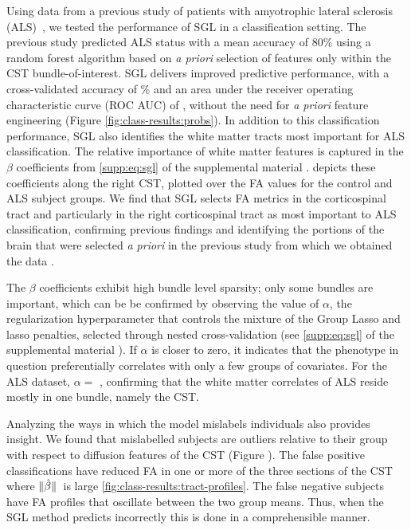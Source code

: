 \documentclass[10pt,%
               aps,%
               prl,%
               preprint,%
               superscriptaddress,%
               preprintnumbers,%
               amsmath,%
               floatfix,%
               endfloats*]{revtex4-1}
\begin{document}
Using data from a previous study of patients with amyotrophic lateral sclerosis (ALS)~\cite{sarica2017corticospinal}, we tested the performance of SGL in a
classification setting. The previous study predicted ALS status with a mean
accuracy of 80\% using a random forest algorithm based on \emph{a priori}
selection of features only within the CST bundle-of-interest.
SGL delivers improved predictive performance, with a cross-validated accuracy of {\alsAccuracy}\% and an area under the receiver operating characteristic curve (ROC AUC) of {\alsRocAuc}, without the need for \emph{a priori} feature engineering (Figure \cref{fig:class-results:probs}). In addition to this
classification performance, SGL also identifies the white matter tracts most
important for ALS classification. The relative importance of white matter
features is captured in the $\beta$ coefficients from \cref{supp:eq:sgl} of
the supplemental material \cite{supplement}.
 depicts these coefficients along the
right CST, plotted over the FA values for the control and ALS subject groups.
We find that SGL selects FA metrics in the corticospinal tract and
particularly in the right corticospinal tract as most important to ALS
classification, confirming previous findings \cite{van2011upper,
toosy2003diffusion, sarica2014tractography, sage2007quantitative,
sage2009quantitative, karlsborg2004corticospinal, ellis1999diffusion,
cosottini2005diffusion, ciccarelli2009investigation, abe2010voxel} and
identifying the portions of the brain that were selected \emph{a priori} in
the previous study from which we obtained the data
\cite{sarica2017corticospinal}.

The $\beta$ coefficients exhibit high bundle level sparsity; only some
bundles are important, which can be be confirmed by observing the value of
$\alpha$, the regularization hyperparameter that controls the mixture of the
Group Lasso and lasso penalties, selected through nested cross-validation
(see \cref{supp:eq:sgl} of the supplemental material \cite{supplement}).
If $\alpha$ is closer to zero, it indicates that the phenotype in question
preferentially correlates with only a few groups of covariates. For the ALS
dataset, $\alpha = $ \alsLRatio, confirming that the white matter correlates
of ALS reside mostly in one bundle, namely the CST.

Analyzing the ways in which the model mislabels individuals also provides
insight. We found that mislabelled subjects are outliers relative to their
group with respect to diffusion features of the CST (Figure
).
The false positive classifications have reduced FA in one or more of the three
sections of the CST where $\norm*{\hat{\beta}}$ is large
\cref{fig:class-results:tract-profiles}. The false negative subjects have FA
profiles that oscillate between the two group means. Thus, when the SGL
method predicts incorrectly this is done in a comprehensible manner.
\end{document}
